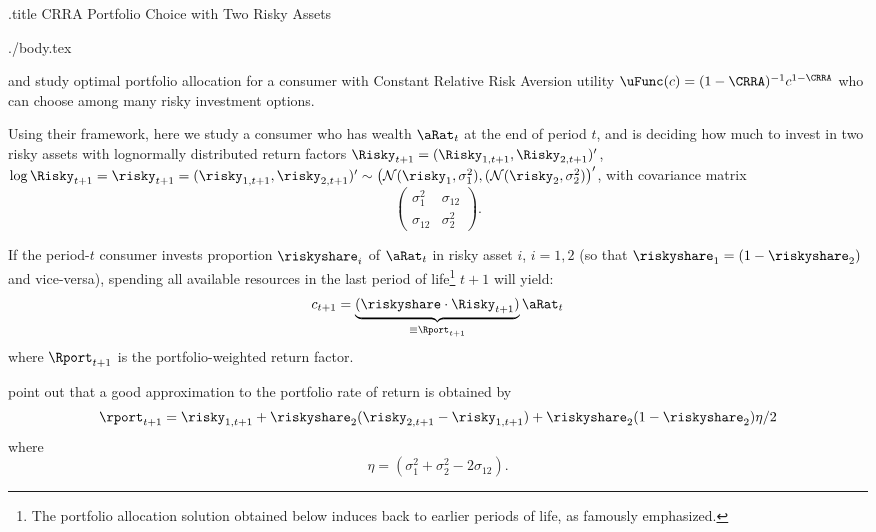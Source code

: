 \documentclass{handout}
\begin{document}
\handoutHeader


\begin{verbatimwrite}{\jobname.title}
CRRA Portfolio Choice with Two Risky Assets
\end{verbatimwrite}
\medskip\medskip\medskip

\handoutNameMake
\begin{verbatimwrite}{./body.tex}

\cite{merton:restat} and \cite{samuelson:portfolio} study 
  optimal portfolio allocation for a consumer with Constant Relative Risk
  Aversion utility $\uFunc(c) = (1-\CRRA)^{-1}c^{1-\CRRA}$ who can choose
among many risky investment options.

Using their framework, here we study a consumer who has wealth
$\aRat_{t}$ at the end of period $t$, and is deciding how much to
invest in two risky assets with lognormally distributed return factors
$\Risky_{t+1}=(\Risky_{1,t+1}, \Risky_{2,t+1})'$, $\log \Risky_{t+1} =
\risky_{t+1}=(\risky_{1,t+1}, \risky_{2,t+1})' \sim \left (
  \mathcal{N}(\risky_1,\sigma^{2}_{1}), (
  \mathcal{N}(\risky_2,\sigma^{2}_{2}) \right)'$, with covariance
matrix
\begin{equation*}
 \left(\begin{array}{ccc}\sigma_1^2 & \sigma_{12} \\ \sigma_{12}& \sigma_2^2\end{array}\right).
\end{equation*}


If the period-$t$ consumer invests proportion $\riskyshare_i$ of $\aRat_{t}$ in  risky asset $i$, $i=1,2$ (so that $\riskyshare_{1}=(1-\riskyshare_{2})$ and vice-versa), spending all available resources in the last period of life\footnote{The portfolio allocation solution obtained below induces back to earlier periods of life, as \cite{samuelsonFallacy,samuelsonJudgment} famously emphasized.} $t+1$ will yield:
\begin{equation}\begin{gathered}\begin{aligned}
c_{t+1}  =  \underbrace{(\riskyshare \cdot \Risky_{t+1} )}_{\equiv \Rport_{t+1}} \aRat_{t} \notag \label{eq:RportDef}
\end{aligned}\end{gathered}\end{equation}
where $\Rport_{t+1}$ is the portfolio-weighted return factor.  

\cite{cvAppendix} point out that a good approximation to the portfolio rate of return is obtained by
\begin{equation}\begin{gathered}\begin{aligned}
\rport_{t+1} = \risky_{1,t+1}+\riskyshare_{2} (\risky_{2,t+1}-\risky_{1,t+1})+ \riskyshare_2 (1-\riskyshare_2) \eta/2
\end{aligned}\end{gathered}\end{equation}
where
$$\eta=(\sigma_1^2+\sigma_2^2-2\sigma_{12}). $$


\end{verbatimwrite}
\end{document}
